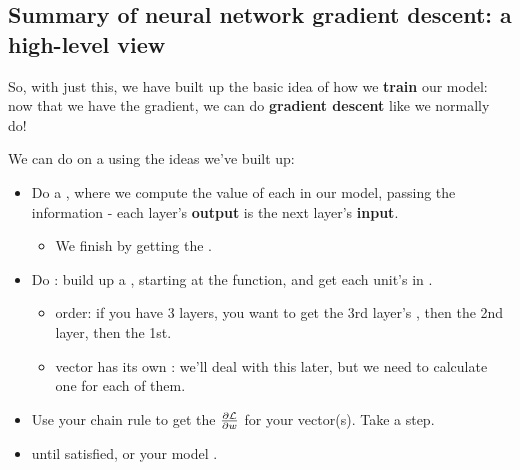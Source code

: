     \phantom{}
    
    \subsection{Summary of neural network gradient descent: a high-level view}
    
        So, with just this, we have built up the basic idea of how we \textbf{train} our model: now that we have the gradient, we can do \textbf{gradient descent} like we normally do!
            \\
        
        \begin{concept}
            We can do  on a  using the ideas we've built up:
            
            \begin{itemize}
                \item Do a , where we compute the value of each  in our model, passing the information  - each layer's \textbf{output} is the next layer's \textbf{input}.
                    \begin{itemize}
                        \item We finish by getting the .
                    \end{itemize}
                    
            \phantom{}
                    
                \item Do : build up a , starting at the  function, and get each unit's  in .
                    \begin{itemize}
                        \item {} order: if you have 3 layers, you want to get the 3rd layer's , then the 2nd layer, then the 1st.
                        
                        \item {} vector has its own : we'll deal with this later, but we need to calculate one for each of them.
                    \end{itemize}
                    
            \phantom{}
                
                \item Use your chain rule to get the  $\frac{\partial \mathcal{L}}{\partial w}$ for your  vector(s). Take a  step.
                
                \item {} until satisfied, or your model .
            \end{itemize}
        \end{concept}
        
